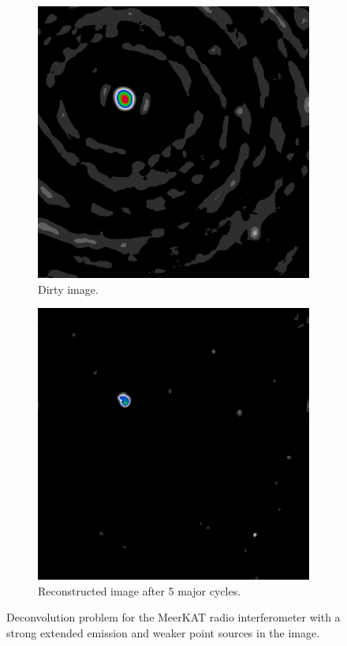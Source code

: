 \begin{figure}[h]
	
	\begin{subfigure}[b]{0.4\linewidth}
		\includegraphics[width=\linewidth]{./chapters/01.intro/mk2/dirty.png}
		\caption{Dirty image.}
		\label{intro:major:dynamic:dirty}
	\end{subfigure}
	\begin{subfigure}[b]{0.4\linewidth}
		\includegraphics[width=\linewidth]{./chapters/01.intro/mk2/clean.png}
		\caption{Reconstructed image after 5 major cycles.}
		\label{intro:major:dynamic:tclean}
	\end{subfigure}
	
	\caption{Deconvolution problem for the MeerKAT radio interferometer with a strong extended emission and weaker point sources in the image.}
	\label{intro:major:dynamic}
\end{figure}


